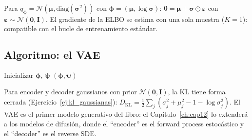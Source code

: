 Para $q_{\bm{\phi}} = \mathcal{N}(\bm{\mu},\text{diag}(\bm{\sigma}^2))$
con $\bm{\phi} = (\bm{\mu},\log\bm{\sigma})$:
$\bm{\theta} = \bm{\mu} + \bm{\sigma}\odot\bm{\varepsilon}$ con
$\bm{\varepsilon} \sim \mathcal{N}(\bm{0},\bm{I})$. El gradiente de la
ELBO se estima con una sola muestra ($K = 1$): compatible con el bucle
de entrenamiento estándar.

\subsection{Algoritmo: el VAE}
\label{subsec:alg_vae}

\begin{algorithm}[H]
\caption{Variational Autoencoder (VAE): entrenamiento}
\label{alg:vae}

Inicializar $\bm{\phi}$, $\bm{\psi}$\;
\Return $(\bm{\phi}, \bm{\psi})$\;
\end{algorithm}

Para encoder y decoder gaussianos con prior
$\mathcal{N}(\bm{0},\bm{I})$, la KL tiene forma cerrada
(Ejercicio~\ref{ej:kl_gaussianas}):
$D_{\text{KL}} = \frac{1}{2}\sum_j(\sigma_j^2 + \mu_j^2 - 1 -
\log\sigma_j^2)$. El VAE es el primer modelo generativo del libro: el
Capítulo~\ref{ch:cap12} lo extenderá a los modelos de difusión, donde
el ``encoder'' es el forward process estocástico y el ``decoder'' es el
reverse SDE.

